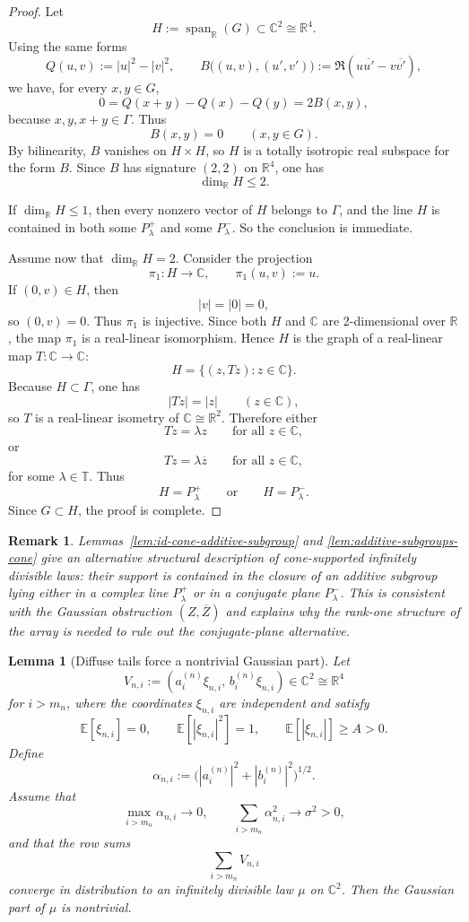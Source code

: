 \documentclass[11pt]{amsart}
\newtheorem{lemma}[theorem]{Lemma}
\newtheorem{remark}[theorem]{Remark}
\newcommand{\E}{\mathbb{E}}
\newcommand{\C}{\mathbb{C}}
\newcommand{\R}{\mathbb{R}}
\newcommand{\T}{\mathbb{T}}
\begin{document}
\begin{proof}
Let
\[
  H:=\operatorname{span}_{\R}(G)\subset \C^2\cong \R^4.
\]
Using the same forms
\[
  Q(u,v):=|u|^2-|v|^2,
  \qquad
  B\bigl((u,v),(u',v')\bigr):=\Re(u\overline{u'}-v\overline{v'}),
\]
we have, for every $x,y\in G$,
\[
  0=Q(x+y)-Q(x)-Q(y)=2B(x,y),
\]
because $x,y,x+y\in \Gamma$.  Thus
\[
  B(x,y)=0
  \qquad (x,y\in G).
\]
By bilinearity, $B$ vanishes on $H\times H$, so $H$ is a totally isotropic
real subspace for the form $B$.  Since $B$ has signature $(2,2)$ on $\R^4$,
one has
\[
  \dim_{\R} H\le 2.
\]

If $\dim_{\R}H\le 1$, then every nonzero vector of $H$ belongs to $\Gamma$, and
the line $H$ is contained in both some $P_\lambda^+$ and some $P_\lambda^-$.
So the conclusion is immediate.

Assume now that $\dim_{\R}H=2$.  Consider the projection
\[
  \pi_1:H\to\C,
  \qquad
  \pi_1(u,v):=u.
\]
If $(0,v)\in H$, then
\[
  |v|=|0|=0,
\]
so $(0,v)=0$.  Thus $\pi_1$ is injective.  Since both $H$ and $\C$ are
2-dimensional over $\R$, the map $\pi_1$ is a real-linear isomorphism.  Hence
$H$ is the graph of a real-linear map $T:\C\to\C$:
\[
  H=\{(z,Tz): z\in\C\}.
\]
Because $H\subset \Gamma$, one has
\[
  |Tz|=|z|
  \qquad (z\in\C),
\]
so $T$ is a real-linear isometry of $\C\cong \R^2$.  Therefore either
\[
  Tz=\lambda z
  \qquad\text{for all } z\in\C,
\]
or
\[
  Tz=\lambda \overline z
  \qquad\text{for all } z\in\C,
\]
for some $\lambda\in\T$.  Thus
\[
  H=P_\lambda^+
  \qquad\text{or}\qquad
  H=P_\lambda^-.
\]
Since $G\subset H$, the proof is complete.
\end{proof}

\begin{remark}
Lemmas~\ref{lem:id-cone-additive-subgroup} and
\ref{lem:additive-subgroups-cone} give an alternative structural description of
cone-supported infinitely divisible laws: their support is contained in the
closure of an additive subgroup lying either in a complex line
$P_\lambda^+$ or in a conjugate plane $P_\lambda^-$.  This is consistent with
the Gaussian obstruction $(Z,\overline Z)$ and explains why the rank-one
structure of the array is needed to rule out the conjugate-plane alternative.
\end{remark}

\begin{lemma}[Diffuse tails force a nontrivial Gaussian part]
\label{lem:tail-gaussian-nontrivial}
Let
\[
  V_{n,i}:=(a_i^{(n)}\xi_{n,i},\,b_i^{(n)}\xi_{n,i})\in\C^2\cong\R^4
\]
for $i>m_n$, where the coordinates $\xi_{n,i}$ are independent and satisfy
\[
  \E[\xi_{n,i}]=0,
  \qquad
  \E[|\xi_{n,i}|^2]=1,
  \qquad
  \E[|\xi_{n,i}|]\ge A>0.
\]
Define
\[
  \alpha_{n,i}:=\bigl(|a_i^{(n)}|^2+|b_i^{(n)}|^2\bigr)^{1/2}.
\]
Assume that
\[
  \max_{i>m_n}\alpha_{n,i}\longrightarrow 0,
  \qquad
  \sum_{i>m_n}\alpha_{n,i}^2\longrightarrow \sigma^2>0,
\]
and that the row sums
\[
  \sum_{i>m_n}V_{n,i}
\]
converge in distribution to an infinitely divisible law $\mu$ on $\C^2$.
Then the Gaussian part of $\mu$ is nontrivial.
\end{lemma}
\end{document}
